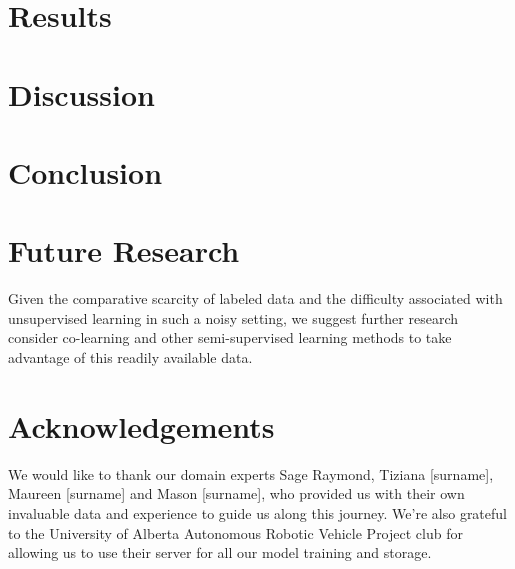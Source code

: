 \documentclass{article}
\begin{document}
\section{Results}

\section{Discussion}

\section{Conclusion}

\section{Future Research}
Given the comparative scarcity of labeled data and the difficulty associated with unsupervised learning in such a noisy setting, we suggest further research consider co-learning and other semi-supervised learning methods to take advantage of this readily available data.

\section{Acknowledgements}
We would like to thank our domain experts Sage Raymond, Tiziana [surname], Maureen [surname] and Mason [surname], who provided us with their own invaluable data and experience to guide us along this journey. We’re also grateful to the University of Alberta Autonomous Robotic Vehicle Project club for allowing us to use their server for all our model training and storage.
\clearpage


\end{document}
